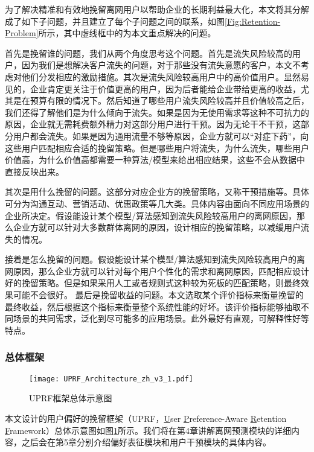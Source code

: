 为了解决精准和有效地挽留离网用户以帮助企业的长期利益最大化，本文将其分解成了如下子问题，并且建立了每个子问题之间的联系，如图\ref{Fig:Retention-Problem}所示，其中虚线框中的为本文重点解决的问题。\par
首先是挽留谁的问题，我们从两个角度思考这个问题。首先是流失风险较高的用户，因为我们是想解决客户流失的问题，对于那些没有流失意愿的客户，本文不考虑对他们分发相应的激励措施。其次是流失风险较高用户中的高价值用户。显然易见的，企业肯定更关注于价值更高的用户，因为后者能给企业带给更高的收益，尤其是在预算有限的情况下。然后知道了哪些用户流失风险较高并且价值较高之后，我们还得了解他们是为什么倾向于流失。如果是因为无使用需求等这种不可抗力的原因，企业就无需耗费额外精力对这部分用户进行干预。因为无论干不干预，这部分用户都会流失。如果是因为通用流量不够等原因，企业方就可以“对症下药”，向这些用户匹配相应合适的挽留策略。但是哪些用户将流失，为什么流失，哪些用户价值高，为什么价值高都需要一种算法/模型来给出相应结果，这些不会从数据中直接反映出来。\par
其次是用什么挽留的问题。这部分对应企业方的挽留策略，又称干预措施等。具体可分为沟通互动、营销活动、优惠政策等几大类。具体内容由面向不同应用场景的企业所决定。假设能设计某个模型/算法感知到流失风险较高用户的离网原因，那么企业方就可以针对大多数群体离网的原因，设计相应的挽留策略，以减缓用户流失的情况。\par
接着是怎么挽留的问题。假设能设计某个模型/算法感知到流失风险较高用户的离网原因，那么企业方就可以针对每个用户个性化的需求和离网原因，匹配相应设计好的挽留策略。但是如果采用人工或者规则式这种较为死板的匹配策略，则最终效果可能不会很好。
最后是挽留收益的问题。本文选取某个评价指标来衡量挽留的最终收益，然后根据这个指标来衡量整个系统性能的好坏。该评价指标能够抽取不同场景的共同需求，泛化到尽可能多的应用场景。此外最好有直观，可解释性好等特点。


\subsubsection{总体框架}
\begin{figure}[!hbt]
	\centering
	\texttt{[image: UPRF\_Architecture\_zh\_v3\_1.pdf]}
	\caption{UPRF框架总体示意图}
	\label{Fig:UPRF}
\end{figure}

本文设计的用户偏好的挽留框架（UPRF，\underline{U}ser \underline{P}reference-Aware \underline{R}etention \underline{F}ramework）总体示意图如图\ref{Fig:UPRF}所示。我们将在第4章讲解离网预测模块的详细内容，之后会在第5章分别介绍偏好表征模块和用户干预模块的具体内容。


